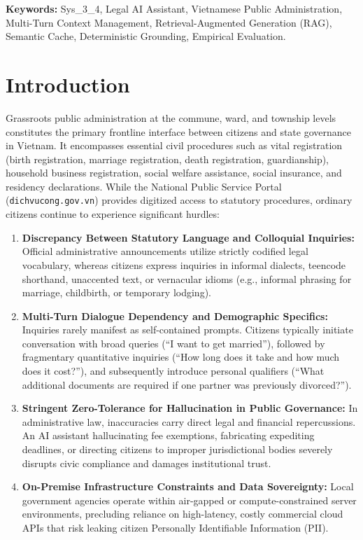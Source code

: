 \documentclass[11pt,a4paper]{article}
\begin{document}
\vspace{1ex}
\noindent\textbf{Keywords:} Sys\_3\_4, Legal AI Assistant, Vietnamese Public Administration, Multi-Turn Context Management, Retrieval-Augmented Generation (RAG), Semantic Cache, Deterministic Grounding, Empirical Evaluation.

\vspace{2ex}
\section{Introduction}
Grassroots public administration at the commune, ward, and township levels constitutes the primary frontline interface between citizens and state governance in Vietnam. It encompasses essential civil procedures such as vital registration (birth registration, marriage registration, death registration, guardianship), household business registration, social welfare assistance, social insurance, and residency declarations. While the National Public Service Portal (\texttt{dichvucong.gov.vn}) provides digitized access to statutory procedures, ordinary citizens continue to experience significant hurdles:

\begin{enumerate}
    \item \textbf{Discrepancy Between Statutory Language and Colloquial Inquiries:} Official administrative announcements utilize strictly codified legal vocabulary, whereas citizens express inquiries in informal dialects, teencode shorthand, unaccented text, or vernacular idioms (e.g., informal phrasing for marriage, childbirth, or temporary lodging).
    \item \textbf{Multi-Turn Dialogue Dependency and Demographic Specifics:} Inquiries rarely manifest as self-contained prompts. Citizens typically initiate conversation with broad queries (``I want to get married''), followed by fragmentary quantitative inquiries (``How long does it take and how much does it cost?''), and subsequently introduce personal qualifiers (``What additional documents are required if one partner was previously divorced?'').
    \item \textbf{Stringent Zero-Tolerance for Hallucination in Public Governance:} In administrative law, inaccuracies carry direct legal and financial repercussions. An AI assistant hallucinating fee exemptions, fabricating expediting deadlines, or directing citizens to improper jurisdictional bodies severely disrupts civic compliance and damages institutional trust.
    \item \textbf{On-Premise Infrastructure Constraints and Data Sovereignty:} Local government agencies operate within air-gapped or compute-constrained server environments, precluding reliance on high-latency, costly commercial cloud APIs that risk leaking citizen Personally Identifiable Information (PII).
\end{enumerate}
\end{document}
